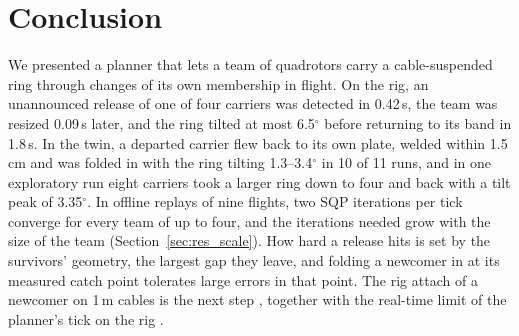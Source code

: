 \section{Conclusion}
\label{sec:conclusion}

We presented a planner that lets a team of quadrotors carry a cable-suspended ring through changes of its own
membership in flight. On the rig, an unannounced release of one of four carriers was detected in 0.42\,s, the team
was resized 0.09\,s later, and the ring tilted at most 6.5$^\circ$ before returning to its band in 1.8\,s. In the twin,
a departed carrier flew back to its own plate, welded within 1.5\,cm and was folded in with the ring tilting
1.3--3.4$^\circ$ in 10 of 11 runs, and in one exploratory run eight carriers took a larger ring down to four and back with a tilt peak of 3.35$^\circ$. In offline
replays of nine flights, two SQP iterations per tick converge for every team of up to four, and the iterations needed grow with the size of the team
(Section~\ref{sec:res_scale}). How hard a release hits is set by the survivors' geometry, the largest gap they leave,
and folding a newcomer in at its measured catch point tolerates large errors in that point. The rig attach of a newcomer on 1\,m cables is the
next step , together with the real-time limit of the planner's tick on the rig
.
